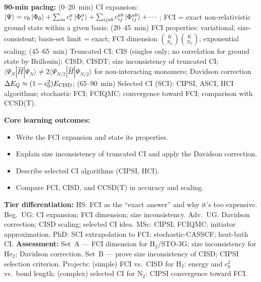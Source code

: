 \documentclass[11pt,a4paper]{article}
\begin{document}
\begin{tcolorbox}[chembox, title={Module~III.2 / L09: Configuration Interaction and the Exact Non-Relativistic Limit}]
\textbf{90-min pacing:} (0--20~min) CI expansion: $\ket{\Psi}=c_0\ket{\Phi_0}+\sum_{ia}c_i^a\ket{\Phi_i^a}+\sum_{ijab}c_{ij}^{ab}\ket{\Phi_{ij}^{ab}}+\cdots$; FCI = exact non-relativistic ground state within a given basis; (20--45~min) FCI properties: variational; size-consistent; basis-set limit = exact; FCI dimension $\binom{K}{N_\alpha}\binom{K}{N_\beta}$; exponential scaling; (45--65~min) Truncated CI: CIS (singles only; no correlation for ground state by Brillouin); CISD; CISDT; size inconsistency of truncated CI; $\langle\Psi_{N}|\hat{H}|\Psi_{N}\rangle \neq 2\langle\Psi_{N/2}|\hat{H}|\Psi_{N/2}\rangle$ for non-interacting monomers; Davidson correction $\Delta E_Q\approx(1-c_0^2)E_{\rm CISD}$; (65--90~min) Selected CI (SCI): CIPSI, ASCI, HCI algorithms; stochastic FCI; FCIQMC; convergence toward FCI; comparison with CCSD(T).

\medskip\textbf{Core learning outcomes:}
\begin{itemize}[leftmargin=1.4em,topsep=2pt,itemsep=1pt]
  \item Write the FCI expansion and state its properties.
  \item Explain size inconsistency of truncated CI and apply the Davidson correction.
  \item Describe selected CI algorithms (CIPSI, HCI).
  \item Compare FCI, CISD, and CCSD(T) in accuracy and scaling.
\end{itemize}
\medskip\textbf{Tier differentiation:}
HS: FCI as the ``exact answer'' and why it's too expensive.
Beg.\ UG: CI expansion; FCI dimension; size inconsistency.
Adv.\ UG: Davidson correction; CISD scaling; selected CI idea.
MSc: CIPSI; FCIQMC; initiator approximation.
PhD: SCI extrapolation to FCI; stochastic-CASSCF; heat-bath CI.
\medskip\textbf{Assessment:}
Set~A --- FCI dimension for H$_2$/STO-3G; size inconsistency for He$_2$; Davidson correction.
Set~B --- prove size inconsistency of CISD; CIPSI selection criterion.
Projects: (simple) FCI vs.\ CISD for H$_2$: energy and $c_0^2$ vs.\ bond length; (complex) selected CI for N$_2$: CIPSI convergence toward FCI.
\end{tcolorbox}

\medskip
\end{document}
